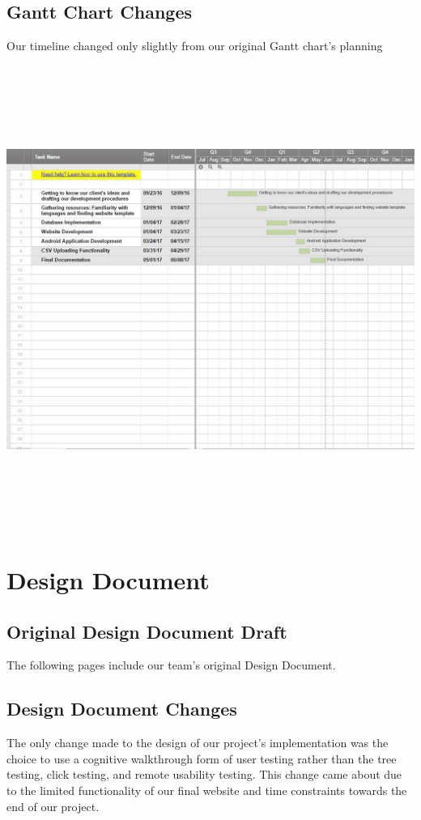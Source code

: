 \documentclass[onecolumn, draftclsnofoot,10pt, compsoc]{IEEEtran}
\begin{document}
\subsection{Gantt Chart Changes}
\noindent Our timeline changed only slightly from our original Gantt chart's planning
\\  \\
\includegraphics[width=18cm, height=15cm]{Final_Gantt.JPG}
\newpage
\section{Design Document}
\subsection{Original Design Document Draft}
\vspace{2cm}\hspace{2.4cm}
\noindent The following pages include our team's original Design Document.
\\
 
\subsection{Design Document Changes}
\noindent The only change made to the design of our project's implementation was the choice to use a cognitive walkthrough form of user testing rather than the tree testing, click testing, and remote usability testing. This change came about due to the limited functionality of our final website and time constraints towards the end of our project.
\newpage
\end{document}

